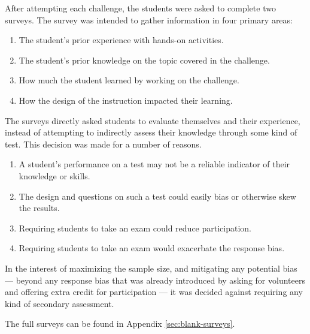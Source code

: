     After attempting each challenge, the students were asked to complete two surveys. %
The survey was intended to gather information in four primary areas:
    \begin{enumerate}
        \item The student's prior experience with hands-on activities.
        \item The student's prior knowledge on the topic covered in the challenge.
        \item How much the student learned by working on the challenge.
        \item How the design of the instruction impacted their learning. 
    \end{enumerate}
    
    The surveys directly asked students to evaluate themselves and their experience, instead of attempting to indirectly assess their knowledge through some kind of test. %
This decision was made for a number of reasons. 
    \begin{enumerate}
        \item A student's performance on a test may not be a reliable indicator of their knowledge or skills.
        \item The design and questions on such a test could easily bias or otherwise skew the results. 
        \item Requiring students to take an exam could reduce participation. 
        \item Requiring students to take an exam would exacerbate the response bias.
    \end{enumerate}

    In the interest of maximizing the sample size, and mitigating any potential bias ---%
 beyond any response bias that was already introduced by asking for volunteers and offering extra credit for participation ---%
 it was decided against requiring any kind of secondary assessment. 

    The full surveys can be found in Appendix \ref{sec:blank-surveys}.


